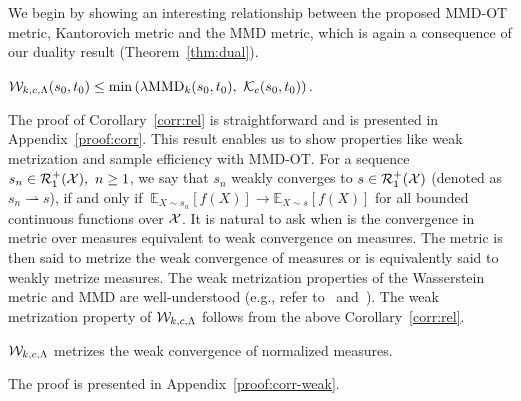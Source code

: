  We begin by showing an interesting relationship between the proposed MMD-OT metric, Kantorovich metric and the MMD metric, which is again a consequence of our duality result (Theorem~\ref{thm:dual}).
 \begin{corollaryBox}
 \begin{corollary}\label{corr:rel}
    $\mathcal{W}_{k, c, \Lambda}(s_0, t_0)\leq \min\left(\lambda\textup{MMD}_k(s_0, t_0),\ \mathcal{K}_c(s_0, t_0)\right).$
\end{corollary}
 \end{corollaryBox}
The proof of Corollary~\ref{corr:rel} is straightforward and is presented in Appendix~\ref{proof:corr}. This result enables us to show properties like weak metrization and sample efficiency with MMD-OT. For a sequence $s_n\in \mathcal{R}_1^+(\mathcal{X}), ~n\geq 1$, we say that $s_n$ weakly converges to $s\in \mathcal{R}_1^+(\mathcal{X})$ (denoted as $s_n\rightharpoonup s$), if and only if $~\mathbb{E}_{X\sim s_n}[f(X)]\rightarrow\mathbb{E}_{X\sim s}[f(X)]$ for all bounded continuous functions over $\mathcal{X}$. It is natural to ask when is the convergence in metric over measures equivalent to weak convergence on measures. The metric is then said to metrize the weak convergence of measures or is equivalently said to weakly metrize measures. The weak metrization properties of the Wasserstein metric and MMD are well-understood (e.g., refer to~\citet[Theorem~6.9]{villanioldnew} and~\citet[Theorem~7]{Gabriel20}). The weak metrization property of $\mathcal{W}_{k, c, \Lambda}$ follows from the above Corollary~\ref{corr:rel}. 
\begin{corollaryBox}
\begin{corollary}\label{corr:weak}
    $\mathcal{W}_{k, c, \Lambda}$ metrizes the weak convergence of normalized measures.
\end{corollary}
\end{corollaryBox}
The proof is presented in Appendix~\ref{proof:corr-weak}. 

